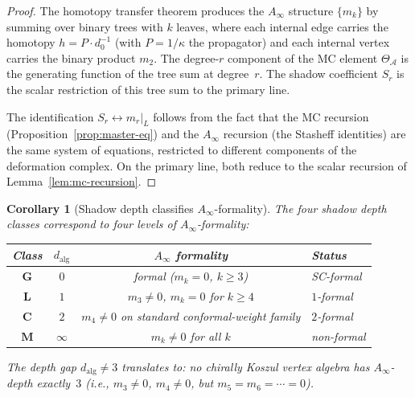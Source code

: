 \documentclass[11pt,reqno]{amsart}
\newtheorem{corollary}[theorem]{Corollary}
\theoremstyle{definition}
\theoremstyle{remark}
\newcommand{\cA}{\mathcal{A}}
\numberwithin{equation}{section}
\begin{document}
\begin{proof}
The homotopy transfer theorem produces the $A_\infty$
structure $\{m_k\}$ by summing over binary trees with $k$
leaves, where each internal edge carries the homotopy
$h = P \cdot d_0^{-1}$ (with $P = 1/\kappa$ the propagator)
and each internal vertex carries the binary product $m_2$.
The degree-$r$ component of the MC element
$\Theta_\cA$ is the generating function of the tree sum
at degree~$r$. The shadow coefficient $S_r$ is the
scalar restriction of this tree sum to the primary line.

The identification $S_r \leftrightarrow m_r|_L$ follows
from the fact that the MC recursion
(Proposition~\ref{prop:master-eq}) and the $A_\infty$
recursion (the Stasheff identities) are the same system
of equations, restricted to different components of the
deformation complex. On the primary line, both reduce to
the scalar recursion of Lemma~\ref{lem:mc-recursion}.
\end{proof}

\begin{corollary}[Shadow depth classifies
$A_\infty$-formality]\label{cor:formality-class}
The four shadow depth classes correspond to four levels of
$A_\infty$-formality:
\begin{center}
\renewcommand{\arraystretch}{1.3}
\begin{tabular}{cccl}
\toprule
Class & $d_{\mathrm{alg}}$ & $A_\infty$ formality & Status \\
\midrule
$\mathbf{G}$ & $0$ & formal ($m_k = 0$, $k \ge 3$) & SC-formal \\
$\mathbf{L}$ & $1$ & $m_3 \ne 0$, $m_k = 0$ for $k \ge 4$
 & $1$-formal \\
$\mathbf{C}$ & $2$ & $m_4 \ne 0$ on standard conformal-weight family
 & $2$-formal \\
$\mathbf{M}$ & $\infty$ & $m_k \ne 0$ for all $k$
 & non-formal \\
\bottomrule
\end{tabular}
\end{center}
\noindent The depth gap $d_{\mathrm{alg}} \ne 3$ translates
to: no chirally Koszul vertex algebra has $A_\infty$-depth
exactly~$3$ (i.e., $m_3 \ne 0$, $m_4 \ne 0$, but
$m_5 = m_6 = \cdots = 0$).
\end{corollary}
\end{document}
